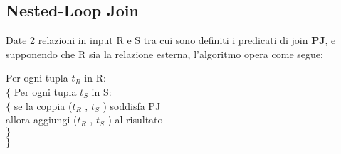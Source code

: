 \documentclass[a4paper, 10pt]{article}
\theoremstyle{definition}
\begin{document}
			\subsection*{Nested-Loop Join}
				Date 2 relazioni in input R e S tra cui sono definiti i predicati
				di join \textbf{PJ}, e supponendo che R sia la relazione esterna,
				l'algoritmo opera come segue:
				
				\noindent
				Per ogni tupla $ t_R $ in R:\\
				\hspace*{1cm} $ \{ $ Per ogni tupla $ t_S $ in S:\\
				\hspace*{2cm}	$ \{ $ se la coppia ($ t_R $ , $ t_S $ ) soddisfa PJ\\
				\hspace*{2.3cm}	allora aggiungi ($ t_R $ , $ t_S $ ) al risultato \\
				\hspace*{2cm} $ \} $\\
				\hspace*{1cm} $ \} $		
				
				
\end{document}
